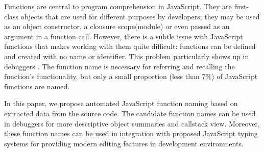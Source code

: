 \documentclass{acm_proc_article-sp}
\begin{document}
Functions are central to program comprehension in JavaScript. They are first-class objects that are used for different purposes by developers; 
they may be used as an object  constructor, a clousure scope(module) or even  passed as an argument in a function call. However, there is a subtle issue with JavaScript functions that makes working with them quite difficult: functions can be defined and created with no name or identifier. This problem particularly shows up in debuggers \cite{Zaytsev}. The function name is necessary for referring and recalling the function's functionality, but only a small proportion (less than 7\%) of JavaScript functions are named.

In this paper, we propose automated JavaScript function naming based on extracted data from the source code. The candidate function names can be used in debuggers for more descriptive object summaries and callstack view. Moreover, these function names can be used in integration with proposed JavaScript typing systems for providing modern editing features in development environments.


\begin{table}
\centering
\caption{The total number of functions and the number of named functions in ten famous JavaScript projects.}
 \label{functions} 
\end{table}    
\end{document}

